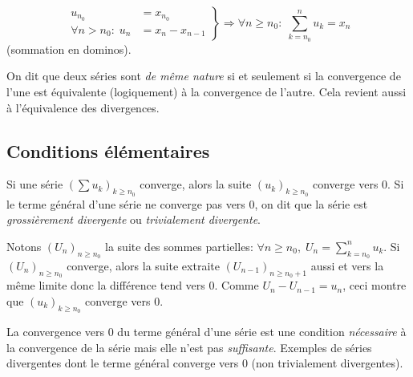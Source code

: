 \begin{displaymath}
\left. 
\begin{aligned}
  u_{n_0} &= x_{n_0}\\
  \forall n > n_0:\; u_{n} &= x_n - x_{n-1}  
\end{aligned}
\right\rbrace \Rightarrow
\forall n \geq n_0: \;\sum_{k=n_0}^{n}u_k = x_n
\end{displaymath}
(sommation en dominos).
\begin{defi}
  On dit que deux séries sont \emph{de même nature} si et seulement si la convergence de l'une est équivalente (logiquement) à la convergence de l'autre. Cela revient aussi à l'équivalence des divergences. 
\end{defi}


\subsection{Conditions élémentaires}
\begin{prop}
  Si une série $\left( \sum u_k\right)_{k\geq n_0} $ converge, alors la suite $(u_k)_{k\geq n_0}$ converge vers $0$. Si le terme général d'une série ne converge pas vers $0$, on dit que la série est \emph{grossièrement divergente} ou \emph{trivialement divergente}.
\end{prop}
\begin{demo}
  Notons $(U_n)_{n\geq n_0}$ la suite des sommes partielles: $\forall n \geq n_0, \; U_n = \sum_{k=n_0}^{n}u_k$. Si $(U_n)_{n\geq n_0}$ converge, alors la suite extraite $(U_{n-1})_{n\geq n_0 +1}$ aussi et vers la même limite donc la différence tend vers $0$. Comme $U_n-U_{n-1}=u_n$, ceci montre que $(u_k)_{k\geq n_0}$ converge vers $0$.
\end{demo}
La convergence vers $0$ du terme général d'une série est une condition \emph{nécessaire} à la convergence de la série mais elle n'est pas \emph{suffisante}.\newline
Exemples de séries divergentes dont le terme général converge vers $0$ (non trivialement divergentes).
